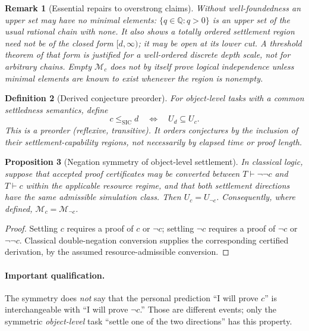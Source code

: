 \documentclass[11pt,letterpaper]{article}
\newtheorem{definition}{Definition}[section]
\newtheorem{proposition}[definition]{Proposition}
\newtheorem{remark}[definition]{Remark}
\begin{document}
\begin{remark}[Essential repairs to overstrong claims]
Without well-foundedness an upper set may have \emph{no} minimal elements: $\{q\in\mathbb Q:q>0\}$ is an upper set of the usual rational chain with none. It also shows a totally ordered settlement region need not be of the closed form $[d,\infty)$; it may be open at its lower cut. A threshold theorem of that form is justified for a well-ordered discrete depth scale, not for arbitrary chains. Empty $\mathcal M_c$ does not by itself prove logical independence unless minimal elements are known to exist whenever the region is nonempty.
\end{remark}

\begin{definition}[Derived conjecture preorder]
For object-level tasks with a common settledness semantics, define
\[
c\le_{\mathrm{SIC}}d\quad\Longleftrightarrow\quad U_d\subseteq U_c.
\]
This is a preorder (reflexive, transitive). It orders conjectures by the inclusion of their settlement-capability regions, not necessarily by elapsed time or proof length.
\end{definition}

\begin{proposition}[Negation symmetry of object-level settlement]
In classical logic, suppose that accepted proof certificates may be converted between $T\vdash\neg\neg c$ and $T\vdash c$ within the applicable resource regime, and that both settlement directions have the same admissible simulation class. Then $U_c=U_{\neg c}$. Consequently, where defined, $\mathcal M_c=\mathcal M_{\neg c}$.
\end{proposition}
\begin{proof}
Settling $c$ requires a proof of $c$ or $\neg c$; settling $\neg c$ requires a proof of $\neg c$ or $\neg\neg c$. Classical double-negation conversion supplies the corresponding certified derivation, by the assumed resource-admissible conversion.\end{proof}

\paragraph{Important qualification.} The symmetry does \emph{not} say that the personal prediction ``I will prove $c$'' is interchangeable with ``I will prove $\neg c$.'' Those are different events; only the symmetric \emph{object-level} task ``settle one of the two directions'' has this property.
\end{document}
